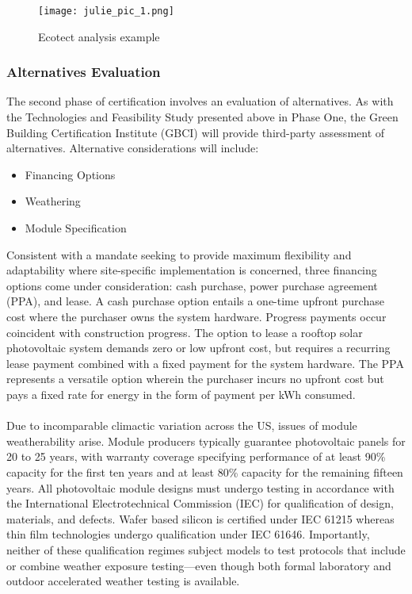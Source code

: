 \begin{figure}
\begin{center}
\texttt{[image: julie\_pic\_1.png]}
\caption{Ecotect analysis example}
\label{juliefig1}
\end{center}
\end{figure}


\subsubsection{Alternatives Evaluation}
The second phase of certification involves an evaluation of alternatives. As with the Technologies and Feasibility Study presented above in Phase One, the Green Building Certification Institute (GBCI) will provide third-party assessment of alternatives. Alternative considerations will include:

\begin{itemize}
\item Financing Options
\item Weathering
\item Module Specification
\end{itemize}

Consistent with a mandate seeking to provide maximum flexibility and adaptability where site-specific implementation is concerned, three financing options come under consideration: cash purchase, power purchase agreement (PPA), and lease. A cash purchase option entails a one-time upfront purchase cost where the purchaser owns the system hardware. Progress payments occur coincident with construction progress. The option to lease a rooftop solar photovoltaic system demands zero or low upfront cost, but requires a recurring lease payment combined with a fixed payment for the system hardware. The PPA represents a versatile option wherein the purchaser incurs no upfront cost but pays a fixed rate for energy in the form of payment per kWh consumed.
\\\\
\noindent Due to incomparable climactic variation across the US, issues of module weatherability arise. Module producers typically guarantee photovoltaic panels for 20 to 25 years, with warranty coverage specifying performance of at least 90\% capacity for the first ten years and at least 80\% capacity for the remaining fifteen years. All photovoltaic module designs must undergo testing in accordance with the International Electrotechnical Commission (IEC) for qualification of design, materials, and defects. Wafer based silicon is certified under IEC 61215 whereas thin film technologies undergo qualification under IEC 61646. Importantly, neither of these qualification regimes subject models to test protocols that include or combine weather exposure testing—even though both formal laboratory and outdoor accelerated weather testing is available.


